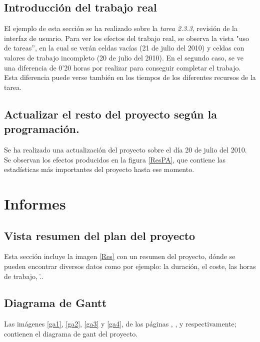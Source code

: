 \documentclass[11pt,a4paper,spanish,twoside]{book}
\begin{document}
\section{Introducción del trabajo real}
El ejemplo de esta sección se ha realizado sobre la \emph{tarea 2.3.3}, 
revisión de la interfaz de usuario. Para ver los efectos del trabajo real, se 
observa la vista "uso de tareas'', en la cual se verán celdas vacías (21 de 
julio del 2010) y celdas con valores de trabajo incompleto (20 de julio del 
2010). En el segundo caso, se ve una diferencia de 0'20 horas por realizar para
conseguir completar el trabajo. Esta diferencia puede verse también en los 
tiempos de los diferentes recursos de la tarea.

\section{Actualizar el resto del proyecto según la programación.}
Se ha realizado una actualización del proyecto sobre el día 20 de julio del 
2010. Se observan los efectos producidos en la figura \ref{ResPA}, que contiene
las estadísticas más importantes del proyecto hasta ese momento.


\chapter{Informes}
\section{Vista resumen del plan del proyecto}
Esta sección incluye la imagen \ref{Res} con un resumen del proyecto, dónde
se pueden encontrar diversos datos como por ejemplo: la duración, el coste,
las horas de trabajo, \...


\section{Diagrama de Gantt}
Las imágenes \ref{ga1}, \ref{ga2}, \ref{ga3} y \ref{ga4}, de las páginas
\pageref{ga1}, \pageref{ga2}, \pageref{ga3} y \pageref{ga4} respectivamente;
contienen el diagrama de gant del proyecto.

\begin{sidewaystable}
\end{sidewaystable}
\end{document}
